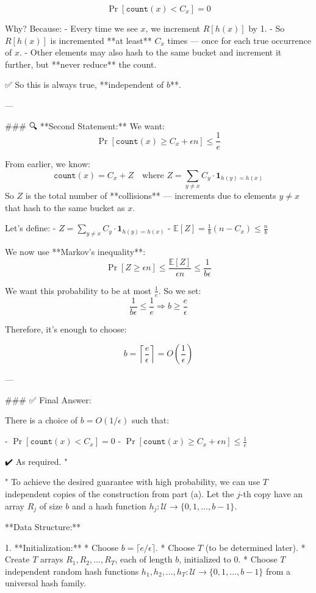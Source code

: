 \begin{enumerate}
\begin{shaded}
\[
\Pr[ \texttt{count}(x) < C_x ] = 0
\]

Why? Because:
- Every time we see \( x \), we increment \( R[h(x)] \) by 1.
- So \( R[h(x)] \) is incremented **at least** \( C_x \) times — once for each true occurrence of \( x \).
- Other elements may also hash to the same bucket and increment it further, but **never reduce** the count.

✅ So this is always true, **independent of \( b \)**.

---

### 🔍 **Second Statement:**
We want:
\[
\Pr[\texttt{count}(x) \geq C_x + \epsilon n] \leq \frac{1}{e}
\]

From earlier, we know:
\[
\texttt{count}(x) = C_x + Z \quad \text{where } Z = \sum_{y \ne x} C_y \cdot \mathbf{1}_{h(y) = h(x)}
\]
So \( Z \) is the total number of **collisions** — increments due to elements \( y \ne x \) that hash to the same bucket as \( x \).

Let's define:
- \( Z = \sum_{y \ne x} C_y \cdot \mathbf{1}_{h(y) = h(x)} \)
- \( \mathbb{E}[Z] = \frac{1}{b}(n - C_x) \leq \frac{n}{b} \)

We now use **Markov's inequality**:
\[
\Pr[Z \geq \epsilon n] \leq \frac{\mathbb{E}[Z]}{\epsilon n} \leq \frac{1}{b \epsilon}
\]

We want this probability to be at most \( \frac{1}{e} \). So we set:
\[
\frac{1}{b \epsilon} \leq \frac{1}{e} \Rightarrow b \geq \frac{e}{\epsilon}
\]

Therefore, it's enough to choose:

\[
b = \left\lceil \frac{e}{\epsilon} \right\rceil = O\left(\frac{1}{\epsilon}\right)
\]

---

### ✅ Final Answer:

There is a choice of \( b = O(1/\epsilon) \) such that:

- \( \Pr[\texttt{count}(x) < C_x] = 0 \)
- \( \Pr[\texttt{count}(x) \geq C_x + \epsilon n] \leq \frac{1}{e} \)

✔️ As required.
"

"
To achieve the desired guarantee with high probability, we can use $T$ independent copies of the construction from part (a). Let the $j$-th copy have an array $R_j$ of size $b$ and a hash function $h_j: \mathcal{U} \to \{0, 1, \ldots, b - 1\}$.

**Data Structure:**

1.  **Initialization:**
    * Choose $b = \lceil e / \epsilon \rceil$.
    * Choose $T$ (to be determined later).
    * Create $T$ arrays $R_1, R_2, \ldots, R_T$, each of length $b$, initialized to 0.
    * Choose $T$ independent random hash functions $h_1, h_2, \ldots, h_T: \mathcal{U} \to \{0, 1, \ldots, b - 1\}$ from a universal hash family.


\end{shaded}
\end{enumerate}
